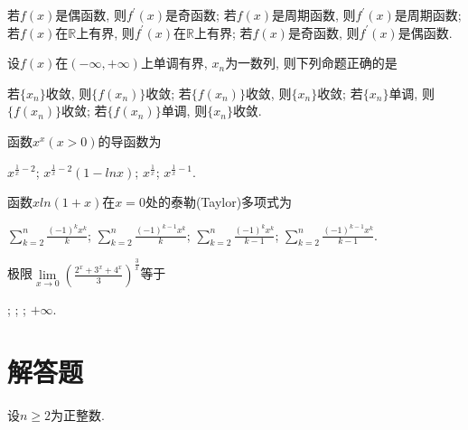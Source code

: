 \documentclass{exam}
\begin{document}
\begin{questions}
\begin{choices}
        \choice 若$f(x)$是偶函数, 则$f^{'}(x)$是奇函数;
        \choice 若$f(x)$是周期函数, 则$f^{'}(x)$是周期函数;
        \choice 若$f(x)$在$\mathbb{R}$上有界, 则$f^{'}(x)$在$\mathbb{R}$上有界;
        \choice 若$f(x)$是奇函数, 则$f^{'}(x)$是偶函数.
    \end{choices}
    \question[3]设$f(x)$在$(-\infty, +\infty)$上单调有界, ${x_n}$为一数列, 则下列命题正确的是
    \begin{choices}
        \choice 若$\{x_n\}$收敛, 则$\{f(x_n)\}$收敛;
        \choice 若$\{f(x_n)\}$收敛, 则$\{x_n\}$收敛;
        \choice 若$\{x_n\}$单调, 则$\{f(x_n)\}$收敛;
        \choice 若$\{f(x_n)\}$单调, 则$\{x_n\}$收敛.
    \end{choices}
    \question[3]函数$x^x (x>0)$的导函数为
    \begin{choices}
        \choice $x^{\frac{1}{x}-2}$;
        \choice $x^{\frac{1}{x}-2}(1-lnx)$;
        \choice $x^{\frac{1}{x}}$;
        \choice $x^{\frac{1}{x}-1}$.
    \end{choices}
    \question[3]函数$xln(1+x)$在$x=0$处的泰勒(Taylor)多项式为
    \begin{choices}
        \choice $\sum_{k=2}^{n}\frac{(-1)^kx^k}{k}$;
        \choice $\sum_{k=2}^{n}\frac{(-1)^{k-1}x^k}{k}$;
        \choice $\sum_{k=2}^{n}\frac{(-1)^kx^k}{k-1}$;
        \choice $\sum_{k=2}^{n}\frac{(-1)^{k-1}x^k}{k-1}$.
    \end{choices}
    \question[3]极限$\lim\limits_{x \to 0}(\frac{2^x+3^x+4^x}{3})^{\frac{3}{x}}$等于
    \begin{choices}
        ;
        ;
        ;
        \choice $+\infty$.
    \end{choices}
    \section{解答题}
    \question[10]
    \question[10]设$n \geq 2$为正整数.
    \begin{parts}

\end{parts}
\end{questions}
\end{document}

